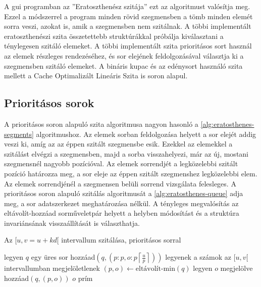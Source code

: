 A gui programban az ''Eratoszthenész szitája'' ezt az algoritmust valósítja meg.
Ezzel a módszerrel a program minden rövid szegmensben a tömb minden elemét sorra veszi, azokat is, amik a szegmensben nem szitálnak.
A többi implementált eratoszthenészi szita összetettebb struktúrákkal próbálja kiválasztani a ténylegesen szitáló elemeket.
A többi implementált szita prioritásos sort használ az elemek részleges rendezéséhez, és sor elejének feldolgozásával választja ki a szegmensben szitáló elemeket.
A bináris kupac és az edénysort használó szita mellett a Cache Optimalizált Lineáris Szita is soron alapul.

\subsection{Prioritásos sorok}

A prioritásos soron alapuló szita algoritmusa nagyon hasonló a \ref{alg:eratosthenes-segments} algoritmushoz.
Az elemek sorban feldolgozása helyett a sor elejét addig veszi ki, amíg az az éppen szitált szegmensbe esik.
Ezekkel az elemekkel a szitálást elvégzi a szegmensben, majd a sorba visszahelyezi, már az új, mostani szegmensnél nagyobb pozícióval.
Az elemek sorrendjét a legközelebbi szitált pozíció határozza meg, a sor eleje az éppen szitált szegmenshez legközelebbi elem.
Az elemek sorrendjénél a szegmensen belüli sorrend vizsgálata felesleges.
A prioritásos soron alapuló szitálás algoritmusát a \ref{alg:eratosthenes-queue} adja meg, a sor adatszerkezet meghatározása nélkül.
A tényleges megvalósítás az eltávolít-hozzáad sorműveletpár helyett a helyben módosítást és a struktúra invariánsának visszaállítását is választhatja.

\begin{algorithm}
\caption{Az $[u, v=u+kd[$ intervallum szitálása, prioritásos sorral}
\label{alg:eratosthenes-queue}
\begin{algorithmic}[1]
\State legyen $q$ egy üres sor
	\State hozzáad$(q, (p: p, o: p \left \lceil{\frac{u}{p}}\right \rceil))$
\EndFor
{}
	\State legyenek a számok az $[u, v[$ intervallumban megjelöletlenek
		\State $(p, o) \gets \textrm{eltávolít-min}(q)$
			\State legyen $o$ megjelölve
		\EndFor
		\State hozzáad$(q, (p, o))$
	\EndWhile
	\For{$o \in [u, v[$}
			\State $o$ prím
		\EndIf
	\EndFor
\EndFor
\end{algorithmic}
\end{algorithm}

